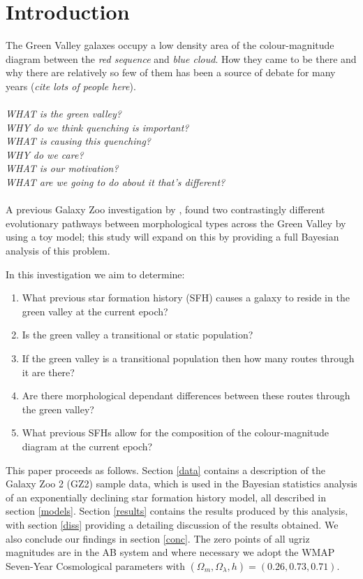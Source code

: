 \documentclass{mn2e}
\begin{document}
\section{Introduction}
The Green Valley galaxes occupy a low density area of the colour-magnitude diagram between the \emph{red sequence} and \emph{blue cloud}. How they came to be there and why there are relatively so few of them has been a source of debate for many years (\emph{cite lots of people here}). 
\\
\\
\emph{WHAT is the green valley?\\ WHY do we think quenching is important? \\ WHAT is causing this quenching? \\ WHY do we care? \\ WHAT is our motivation? \\ WHAT are we going to do about it that's different?}
\\
\\
A previous Galaxy Zoo investigation by  \cite{Sch2014}, found two contrastingly different evolutionary pathways between morphological types across the Green Valley by using a toy model; this study will expand on this by providing a full Bayesian analysis of this problem.

In this investigation we aim to determine: 
\begin{enumerate}
\item What previous star formation history (SFH) causes a galaxy to reside in the green valley at the current epoch?
\item Is the green valley a transitional or static population? 
\item If the green valley is a transitional population then how many routes through it are there? 
\item Are there morphological dependant differences between these routes through the green valley? 
\item What previous SFHs allow for the composition of the colour-magnitude diagram at the current epoch? 
\end{enumerate}

This paper proceeds as follows. Section \ref{data} contains a description of the Galaxy Zoo 2 (GZ2) sample data, which is used in the Bayesian statistics analysis of an exponentially declining star formation history model, all described in section \ref{models}. Section \ref{results} contains the results produced by this analysis, with section \ref{diss} providing a detailing discussion of the results obtained. We also conclude our findings in section \ref{conc}. The zero points of all ugriz magnitudes are in the AB system and where necessary we adopt the WMAP Seven-Year Cosmological parameters \citep{WMAP} with $(\Omega_m, \Omega_{\lambda}, h) = (0.26, 0.73, 0.71)$. 
\end{document}
